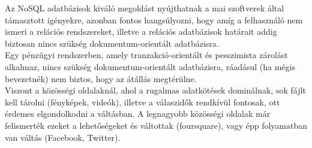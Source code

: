 Az NoSQL adatbázisok kiváló megoldást nyújthatnak a mai szoftverek által támasztott igényekre, azonban fontos hangsúlyozni, hogy amíg a felhasználó nem ismeri a relációs rendszereket, illetve a relációs adatbázisok határait addig biztosan nincs szükség dokumentum-orientált adatbázisra.\\
Egy pénzügyi rendszerben, amely tranzakció-orientált és pesszimista zárolást alkalmaz, nincs szükség dokumentum-orientált adatbázisra, ráadásul (ha mégis bevezetnék) nem biztos, hogy az átállás megtérülne.\\
Viszont a közösségi oldalaknál, ahol a rugalmas adatkötések dominálnak, sok fájlt kell tárolni (fényképek, videók), illetve a válaszidők rendkívül fontosak, ott érdemes elgondolkodni a váltásban. A legnagyobb közösségi oldalak már felismerték ezeket a lehetőségeket és váltottak (foursquare), vagy épp folyamatban van váltás (Facebook, Twitter).
